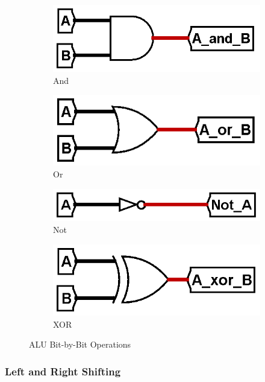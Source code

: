 \documentclass{article}
\begin{document}
\begin{figure}[H]
  \begin{subfigure}{0.5\textwidth}
    \centering
    \includegraphics[width=0.8\linewidth]{circuits/and.png}
    \caption{And}
  \end{subfigure}%
  \begin{subfigure}{0.5\textwidth}
    \centering
    \includegraphics[width=0.8\linewidth]{circuits/or.png}
    \caption{Or}
  \end{subfigure}

  \begin{subfigure}{0.5\textwidth}
    \centering
    \includegraphics[width=0.8\linewidth]{circuits/not.png}
    \caption{Not}
  \end{subfigure}%
  \begin{subfigure}{0.5\textwidth}
    \centering
    \includegraphics[width=0.8\linewidth]{circuits/xor.png}
    \caption{XOR}
  \end{subfigure}

  \caption{ALU Bit-by-Bit Operations}
\end{figure}

\subsubsection{Left and Right Shifting}
\end{document}
